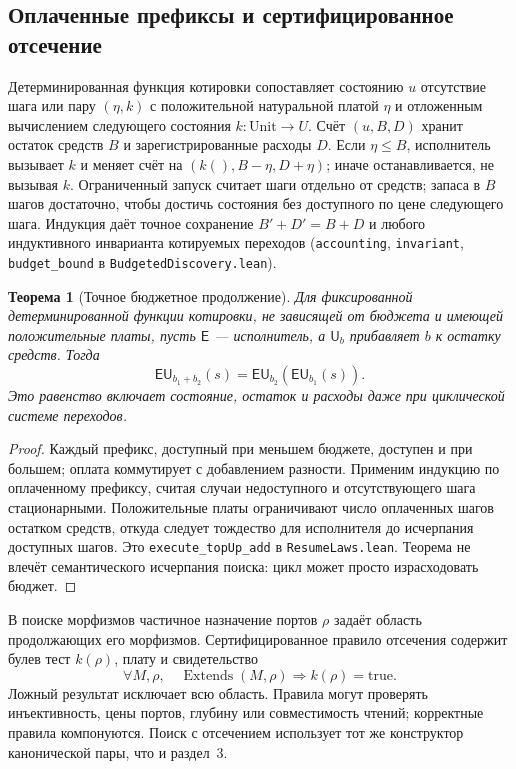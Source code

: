 \documentclass[10pt,a4paper]{article}
\newtheorem{theorem}{Теорема}[section]
\newcommand{\rc}[1]{\allowbreak\texttt{#1}\allowbreak}
\begin{document}
\subsection{Оплаченные префиксы и сертифицированное отсечение}
Детерминированная функция котировки сопоставляет состоянию $u$ отсутствие шага или пару $(\eta, k)$ с положительной натуральной платой $\eta$ и отложенным вычислением следующего состояния $k:\mathrm{Unit}\to U$. Счёт $(u,B,D)$ хранит остаток средств $B$ и зарегистрированные расходы $D$. Если $\eta\le B$, исполнитель вызывает $k$ и меняет счёт на $(k(),B-\eta,D+\eta)$; иначе останавливается, не вызывая $k$. Ограниченный запуск считает шаги отдельно от средств; запаса в $B$ шагов достаточно, чтобы достичь состояния без доступного по цене следующего шага. Индукция даёт точное сохранение $B'+D'=B+D$ и любого индуктивного инварианта котируемых переходов (\rc{accounting}, \rc{invariant}, \rc{budget\_bound} в \rc{BudgetedDiscovery.lean}).

\begin{theorem}[Точное бюджетное продолжение]\label{thm:resume}
Для фиксированной детерминированной функции котировки, не зависящей от бюджета и имеющей положительные платы, пусть $\mathsf E$ --- исполнитель, а $\mathsf U_b$ прибавляет $b$ к остатку средств. Тогда
\[
 \mathsf E\mathsf U_{b_1+b_2}(s)=\mathsf E\mathsf U_{b_2}(\mathsf E\mathsf U_{b_1}(s)).
\]
Это равенство включает состояние, остаток и расходы даже при циклической системе переходов.
\end{theorem}
\begin{proof}
Каждый префикс, доступный при меньшем бюджете, доступен и при большем; оплата коммутирует с добавлением разности. Применим индукцию по оплаченному префиксу, считая случаи недоступного и отсутствующего шага стационарными. Положительные платы ограничивают число оплаченных шагов остатком средств, откуда следует тождество для исполнителя до исчерпания доступных шагов. Это \rc{execute\_topUp\_add} в \rc{ResumeLaws.lean}. Теорема не влечёт семантического исчерпания поиска: цикл может просто израсходовать бюджет.
\end{proof}
В поиске морфизмов частичное назначение портов $\rho$ задаёт область продолжающих его морфизмов. Сертифицированное правило отсечения содержит булев тест $k(\rho)$, плату и свидетельство
\[
 \forall M,\rho,\quad \operatorname{Extends}(M,\rho)\Longrightarrow k(\rho)=\mathrm{true}.
\]
Ложный результат исключает всю область. Правила могут проверять инъективность, цены портов, глубину или совместимость чтений; корректные правила компонуются. Поиск с отсечением использует тот же конструктор канонической пары, что и раздел~3.
\end{document}
